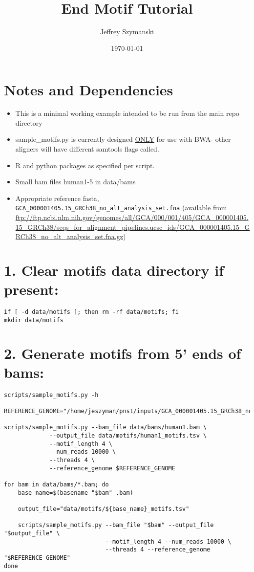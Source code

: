 \documentclass{article}
\author{Jeffrey Szymanski}
\date{\today}
\title{End Motif Tutorial}
\begin{document}
\maketitle
\section*{Notes and Dependencies}
\label{sec:org2b91946}

\begin{itemize}
\item This is a minimal working example intended to be run from the main repo directory
\item sample\_motifs.py is currently designed \uline{ONLY} for use with BWA- other aligners will have different samtools flags called.
\item R and python packages as specified per script.
\item Small bam files human1-5 in data/bams
\item Appropriate reference fasta, \texttt{GCA\_000001405.15\_GRCh38\_no\_alt\_analysis\_set.fna} (available from \url{ftp://ftp.ncbi.nlm.nih.gov/genomes/all/GCA/000/001/405/GCA\_000001405.15\_GRCh38/seqs\_for\_alignment\_pipelines.ucsc\_ids/GCA\_000001405.15\_GRCh38\_no\_alt\_analysis\_set.fna.gz})
\end{itemize}

\section*{1. Clear motifs data directory if present:}
\label{sec:org0b3be21}

\begin{verbatim}
if [ -d data/motifs ]; then rm -rf data/motifs; fi
mkdir data/motifs
\end{verbatim}

\section*{2. Generate motifs from 5' ends of bams:}
\label{sec:org17189ae}

\begin{verbatim}
scripts/sample_motifs.py -h

REFERENCE_GENOME="/home/jeszyman/pnst/inputs/GCA_000001405.15_GRCh38_no_alt_analysis_set.fna"

scripts/sample_motifs.py --bam_file data/bams/human1.bam \
			 --output_file data/motifs/human1_motifs.tsv \
			 --motif_length 4 \
			 --num_reads 10000 \
			 --threads 4 \
			 --reference_genome $REFERENCE_GENOME

for bam in data/bams/*.bam; do
    base_name=$(basename "$bam" .bam)

    output_file="data/motifs/${base_name}_motifs.tsv"

    scripts/sample_motifs.py --bam_file "$bam" --output_file "$output_file" \
                             --motif_length 4 --num_reads 10000 \
                             --threads 4 --reference_genome "$REFERENCE_GENOME"
done
\end{verbatim}
\end{document}
